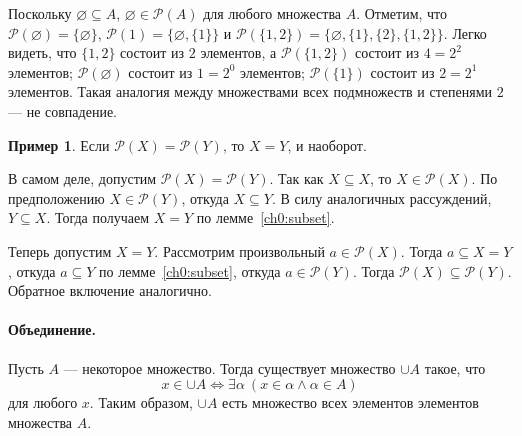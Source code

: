 \documentclass[12pt,notitlepage]{article}
\theoremstyle{plain}
\theoremstyle{definition}
\newtheorem{exm}[thm]{Пример}
\theoremstyle{plain}
\newcommand{\sbs}{\subseteq}
\newcommand{\void}{\varnothing}
\newcommand{\mP}{\mathcal{P}}
\newcommand{\1}{\mathbf{1}}
\newcommand{\0}{\mathbf{0}}
\newcommand{\mcomm}[1]{}
\begin{document}
Поскольку $\void \sbs A$, $\void \in \mP(A)$ для любого множества $A$. Отметим, что $\mP(\void) = \{\void\}$, $\mP(1) = \{\void, \{1\} \}$ и $\mP(\{1,2\}) = \{\void, \{1\}, \{2\}, \{1,2\}\}$. Легко видеть, что $\{1,2\}$ состоит из $2$ элементов, а $\mP(\{1,2\})$ состоит из $4 = 2^2$ элементов; $\mP(\void)$ состоит из $1 = 2^0$ элементов; $\mP(\{1\})$ состоит из $2 = 2^1$ элементов. Такая аналогия между множествами всех подмножеств и степенями $2$ --- не совпадение.

\mcomm{Clearly, every formal proof that the set $\{1,2\}$ has just those subsets as specified above boils down to an exhaustive search argument (for one must at least write all the subsets down). It might be beneficial to draw the tree of all subsets for a small size example, yet we skip such formal proofs in general.}

\begin{exm}
	Если $\mP(X) = \mP(Y)$, то $X  = Y$, и наоборот.
	
	В самом деле, допустим $\mP(X) = \mP(Y)$. Так как $X \sbs X$, то $X \in \mP(X)$. По предположению $X \in \mP(Y)$, откуда $X \sbs Y$. В силу аналогичных рассуждений, $Y \sbs X$. Тогда получаем $X = Y$ по лемме~\ref{ch0:subset}.
	
	Теперь допустим $X = Y$. Рассмотрим произвольный $a \in \mP(X)$. Тогда $a \sbs X = Y$, откуда $a \sbs Y$ по лемме~\ref{ch0:subset}, откуда $a \in \mP(Y)$. Тогда $\mP(X) \sbs \mP(Y)$. Обратное включение аналогично.
\end{exm}

\paragraph{Объединение.} Пусть $A$ --- некоторое множество. Тогда существует множество $\cup A$ такое, что
$$x \in \cup A \iff \exists \alpha\ (x \in \alpha \wedge \alpha \in A)$$
для любого $x$. Таким образом, $\cup A$ есть множество всех элементов элементов множества $A$.

\mcomm{This concept is most likely unknown for most students; so they may need some time to grasp it. In our practice, drawing (potentially) infinite families of planar figures and highlighting their unions with color prove beneficial.
	\medskip\\
	Moreover, depending on the audience, it might be better to replace this general principle by a weaker version:
	\emph{For every sets $A$ and $B$, there exists a set $A \cup B$ such that
		$x \in A \cup B \iff x \in A \vee x \in B$ for all $x$}. This version is sufficient for most of this Course's developments. Countable unions pose a noticeable exception; they are yet neither frequent, nor crucial, nor hard to explain as most students will consider them ``natural'' and ``logical''.}
\end{document}
